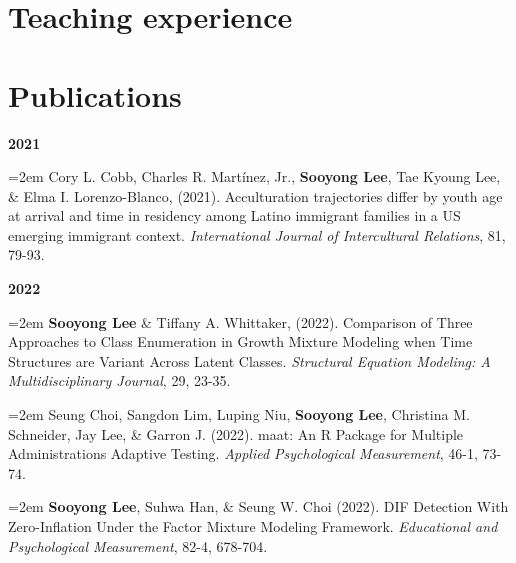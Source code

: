 \documentclass[11pt,a4paper,]{awesome-cv}
\begin{document}
\hypertarget{teaching-experience}{%
\section{Teaching experience}\label{teaching-experience}}

\begin{cventries}
    \vspace{-4.0mm}
    \vspace{-4.0mm}
\end{cventries}

\hypertarget{publications}{%
\section{Publications}\label{publications}}

\setlength{\leftskip}{0cm}

\textbf{2021}

\setlength{\leftskip}{0.5cm}

\hangindent=2em  Cory L. Cobb, Charles R. Martínez, Jr.,
\textbf{Sooyong Lee}, Tae Kyoung Lee, \& Elma I. Lorenzo-Blanco, (2021).
Acculturation trajectories differ by youth age at arrival and time in
residency among Latino immigrant families in a US emerging immigrant
context. \emph{International Journal of Intercultural Relations}, 81,
79-93.

\setlength{\leftskip}{0cm}

\textbf{2022}

\setlength{\leftskip}{0.5cm}

\hangindent=2em  \textbf{Sooyong Lee} \& Tiffany A.
Whittaker, (2022). Comparison of Three Approaches to Class Enumeration
in Growth Mixture Modeling when Time Structures are Variant Across
Latent Classes. \emph{Structural Equation Modeling: A Multidisciplinary
Journal}, 29, 23-35.

\hangindent=2em  Seung Choi, Sangdon Lim, Luping Niu,
\textbf{Sooyong Lee}, Christina M. Schneider, Jay Lee, \& Garron J.
(2022). maat: An R Package for Multiple Administrations Adaptive
Testing. \emph{Applied Psychological Measurement}, 46-1, 73-74.

\hangindent=2em  \textbf{Sooyong Lee}, Suhwa Han, \& Seung
W. Choi (2022). DIF Detection With Zero-Inflation Under the Factor
Mixture Modeling Framework. \emph{Educational and Psychological
Measurement}, 82-4, 678-704.
\end{document}
